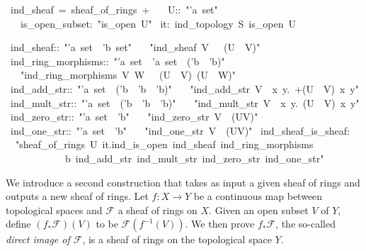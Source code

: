 \documentclass[12pt]{scrartcl}
\begin{document}
\begin{isabelle}
\ ind\_sheaf\ =\ sheaf\_of\_rings\ +\isanewline
\ \ \ U::\ "'a\ set"\isanewline
\ \ \ is\_open\_subset:\ "is\_open\ U"\isanewline
{}\isanewline
\isanewline
{}\ it:\ ind\_topology\ S\ is\_open\ U\isanewline

\ ind\_sheaf::\ "'a\ set\ \isasymRightarrow \ 'b\ set"\isanewline
\ \ \ "ind\_sheaf\ V\ \isasymequiv \ \isasymFF \ (U\ \isasyminter \ V)"\isanewline
\isanewline
{}\ ind\_ring\_morphisms::\ "'a\ set\ \isasymRightarrow \ 'a\ set\ \isasymRightarrow \ ('b\ \isasymRightarrow \ 'b)"\isanewline
\ \ \ "ind\_ring\_morphisms\ V\ W\ \isasymequiv \ \isasymrho \ (U\ \isasyminter \ V)\ (U\ \isasyminter \ W)"\isanewline
\isanewline
{}\ ind\_add\_str::\ "'a\ set\ \isasymRightarrow \ ('b\ \isasymRightarrow \ 'b\ \isasymRightarrow \ 'b)"\isanewline
\ \ \ "ind\_add\_str\ V\ \isasymequiv \ \isasymlambda x\ y.\ +\isactrlbsub (U\ \isasyminter \ V)\isactrlesub \ x\ y"\isanewline
\isanewline
{}\ ind\_mult\_str::\ "'a\ set\ \isasymRightarrow \ ('b\ \isasymRightarrow \ 'b\ \isasymRightarrow \ 'b)"\isanewline
\ \ \ "ind\_mult\_str\ V\ \isasymequiv \ \isasymlambda x\ y.\ \isasymcdot \isactrlbsub (U\ \isasyminter \ V)\isactrlesub \ x\ y"\isanewline
\isanewline
{}\ ind\_zero\_str::\ "'a\ set\ \isasymRightarrow \ 'b"\isanewline
\ \ \ "ind\_zero\_str\ V\ \isasymequiv \ \isasymzero \isactrlbsub (U\isasyminter V)\isactrlesub "\isanewline
\isanewline
{}\ ind\_one\_str::\ "'a\ set\ \isasymRightarrow \ 'b"\isanewline
\ \ \ "ind\_one\_str\ V\ \isasymequiv \ \isasymone \isactrlbsub (U\isasyminter V)\isactrlesub "\isanewline
\isanewline
{}\ ind\_sheaf\_is\_sheaf:\isanewline
\ \ "sheaf\_of\_rings\ U\ it.ind\_is\_open\ ind\_sheaf\ ind\_ring\_morphisms\ \isanewline
\ \ \ \ \ \ \ \ \ \ \ \ b\ ind\_add\_str\ ind\_mult\_str\ ind\_zero\_str\ ind\_one\_str"\isanewline

\end{isabelle}

We introduce a second construction that takes as input a given sheaf of rings and outputs a new sheaf of rings. Let $f: X \rightarrow Y$ be a continuous map between topological spaces and $\mathscr{F}$ a sheaf of rings on $X$. Given an open subset $V$ of $Y$, define $(f_{*} \mathscr{F})(V)$ to be $\mathscr{F} (f^{-1}(V))$. We then prove $f_{*} \mathscr{F}$, the so-called \emph{direct image of  $\mathscr{F}$}, is a sheaf of rings on the topological space $Y$.  
\end{document}
